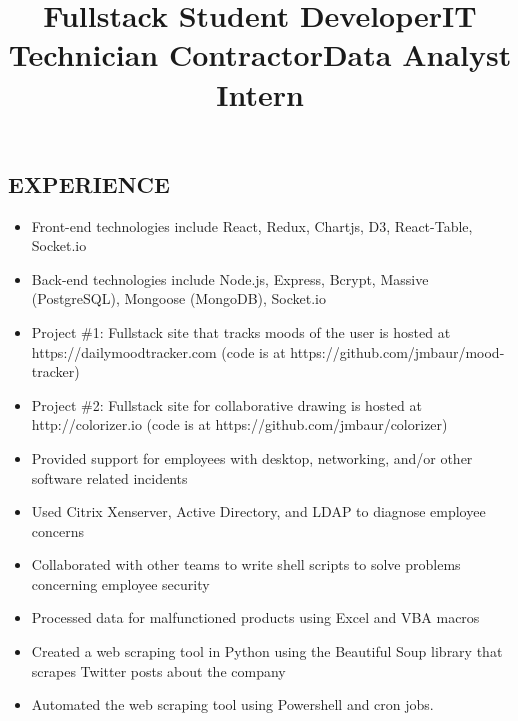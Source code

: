 \documentclass[margin]{res}
\begin{document}
\begin{resume}
\section{EXPERIENCE}

\title{\textbf{Fullstack Student Developer}}
\begin{position}
    \begin{itemize}
        \item Front-end technologies include React, Redux, Chartjs, D3, React-Table, Socket.io
	\item Back-end technologies include Node.js, Express, Bcrypt, Massive (PostgreSQL), Mongoose (MongoDB), Socket.io
        \item Project \#1: Fullstack site that tracks moods of the user is hosted at\\https://dailymoodtracker.com (code is at https://github.com/jmbaur/mood-tracker)
        \item Project \#2: Fullstack site for collaborative drawing is hosted at http://colorizer.io (code is at https://github.com/jmbaur/colorizer)
    \end{itemize}
\end{position}

\title{\textbf{IT Technician} Contractor}
\begin{position}
	\begin{itemize}
        \item Provided support for employees with desktop, networking, and/or other software related incidents
        \item Used Citrix Xenserver, Active Directory, and LDAP to diagnose employee concerns
        \item Collaborated with other teams to write shell scripts to solve problems concerning employee security
	\end{itemize}
\end{position}

\title{\textbf{Data Analyst} Intern}
\begin{position}
	\begin{itemize}
        \item Processed data for malfunctioned products using Excel and VBA macros
        \item Created a web scraping tool in Python using the Beautiful Soup library that scrapes Twitter posts about the company
        \item Automated the web scraping tool using Powershell and cron jobs.
	\end{itemize}
\end{position}


\end{resume}
\end{document}
